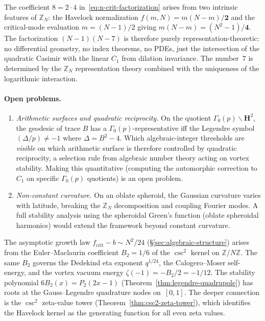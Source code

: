 \noindent
The coefficient $8 = 2 \cdot 4$ in~\eqref{eq:n-crit-factorization}
arises from two intrinsic features of $\mathbb{Z}_N$:
the Havelock normalization $f(m,N) = m(N{-}m)/\mathbf{2}$
and the critical-mode evaluation
$m = (N{-}1)/2$ giving $m(N{-}m) = (N^2{-}1)/\mathbf{4}$.
The factorization $(N{-}1)(N{-}7)$ is therefore purely
representation-theoretic: no differential geometry, no index
theorems, no PDEs, just the intersection of the quadratic
Casimir with the linear $C_1$ from dilation invariance.
The number~$7$ is determined by the $\mathbb{Z}_N$
representation theory combined with the uniqueness of the
logarithmic interaction.

\paragraph{Open problems.}
\begin{enumerate}
  \item \emph{Arithmetic surfaces and quadratic reciprocity.}
    On the quotient $\Gamma_0(p)\backslash\mathbf{H}^2$, the
    geodesic of trace $B$ has a $\Gamma_0(p)$-representative iff
    the Legendre symbol $(\Delta/p) \ne -1$ where $\Delta = B^2 - 4$.
    Which algebraic-integer thresholds are \emph{visible} on which
    arithmetic surface is therefore controlled by quadratic
    reciprocity, a selection rule from algebraic number theory
    acting on vortex stability.  Making this quantitative
    (computing the automorphic correction to $C_1$ on specific
    $\Gamma_0(p)$ quotients) is an open problem.
  \item \emph{Non-constant curvature.}
    On an oblate spheroid, the Gaussian curvature varies with
    latitude, breaking the $\mathbb{Z}_N$ decomposition and
    coupling Fourier modes.
    A full stability analysis using the spheroidal Green's function
    (oblate spheroidal harmonics) would extend the framework
    beyond constant curvature.
\end{enumerate}

\begin{remark}
\label{sec:b2-tower}
The asymptotic growth law $f_{\mathrm{crit}} - b \sim N^2/24$
(\S\ref{sec:algebraic-structure}) arises from the Euler--Maclaurin
coefficient $B_2 = 1/6$ of the $\csc^2$ kernel on $\mathbb{Z}/N\mathbb{Z}$.
The same $B_2$ governs the Dedekind eta exponent $q^{1/24}$,
the Calogero--Moser self-energy, and the vortex vacuum energy
$\zeta(-1) = -B_2/2 = -1/12$.
The stability polynomial $6B_2(x) = P_2(2x{-}1)$
(Theorem~\ref{thm:legendre-quadrupole}) has roots at the
Gauss--Legendre quadrature nodes on~$[0,1]$.
The deeper connection is the $\csc^2$ zeta-value
tower (Theorem~\ref{thm:csc2-zeta-tower}), which
identifies the Havelock kernel as the generating function
for all even zeta values.
\end{remark}

